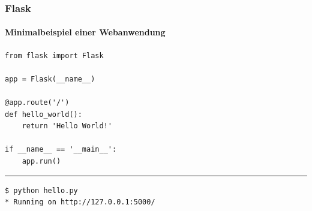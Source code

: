 \documentclass[
    t,
    smaller,
    compress,
    xcolor=svgnames,            %
    table,
]{beamer}
\begin{document}
\begin{frame}
\begin{columns}
\begin{column}{.7\textwidth}
            \end{column}

        \end{columns}
\end{frame}


\begin{frame}[fragile]
  \frametitle{Flask}
  \framesubtitle{Minimalbeispiel einer Webanwendung}

  \vspace{-12pt}
  \begin{lstlisting}[title=hello.py]
from flask import Flask

app = Flask(__name__)

@app.route('/')
def hello_world():
    return 'Hello World!'

if __name__ == '__main__':
    app.run()
  \end{lstlisting}
  \hrule
  \begin{lstlisting}
$ python hello.py
* Running on http://127.0.0.1:5000/
  \end{lstlisting}%
\end{frame}
\end{document}
